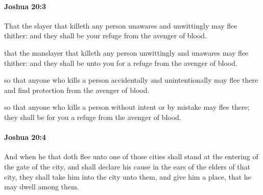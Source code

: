 		\paragraph{Joshua 20:3} %
			\label{JOSHUA-20-3}

			That the slayer that killeth any person unawares and unwittingly may flee thither: and they shall be your refuge from the avenger of blood.

			\begin{versebox}
					\item[BHS] 
					\item[ASV] that the manslayer that killeth any person unwittingly and unawares may flee thither: and they shall be unto you for a refuge from the avenger of blood.
					\item[NIV] so that anyone who kills a person accidentally and unintentionally may flee there and find protection from the avenger of blood.
					\item[NRSV] so that anyone who kills a person without intent or by mistake may flee there; they shall be for you a refuge from the avenger of blood.
			\end{versebox}

		\paragraph{Joshua 20:4} %
			\label{JOSHUA-20-4}

			And when he that doth flee unto one of those cities shall stand at the entering of the gate of the city, and shall declare his cause in the ears of the elders of that city, they shall take him into the city unto them, and give him a place, that he may dwell among them.

